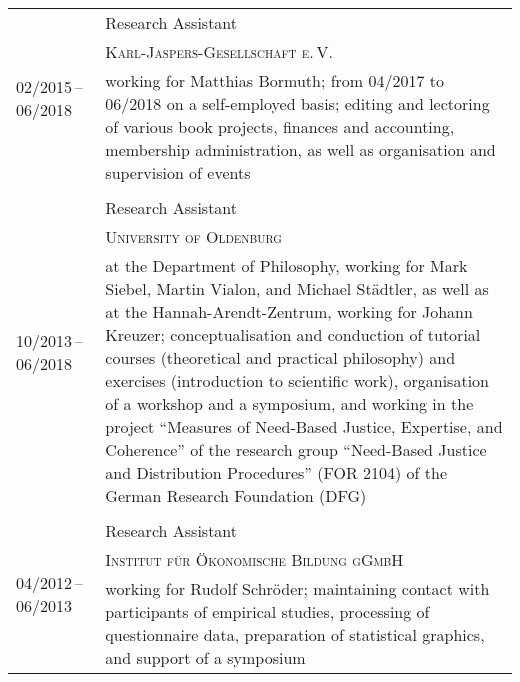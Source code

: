 \documentclass[a4paper,10pt]{article}
\begin{document}
\begin{longtable}{p{2.5cm}p{11cm}}
\\
\multirow{3}{2.5cm}{\footnotesize{02/2015\,--\,06/2018}} & Research Assistant\\
& \textsc{Karl-Jaspers-Gesellschaft e.\,V.}\\
& \footnotesize{working for Matthias Bormuth; from 04/2017 to 06/2018 on a self-employed basis; editing and lectoring of various book projects, finances and accounting, membership administration, as well as organisation and supervision of events}\\
\\
\multirow{3}{2.5cm}{\footnotesize{10/2013\,--\,06/2018}} & Research Assistant\\
& \textsc{University of Oldenburg}\\
& \footnotesize{at the Department of Philosophy, working for Mark Siebel, Martin Vialon, and Michael Städtler, as well as at the Hannah-Arendt-Zentrum, working for Johann Kreuzer; conceptualisation and conduction of tutorial courses (theoretical and practical philosophy) and exercises (introduction to scientific work), organisation of a workshop and a symposium, and working in the project \enquote{Measures of Need-Based Justice, Expertise, and Coherence} of the research group \enquote{Need-Based Justice and Distribution Procedures} (FOR 2104) of the German Research Foundation (DFG)}\\
\\
\multirow{3}{2.5cm}{\footnotesize{04/2012\,--\,06/2013}} & Research Assistant\\
& \textsc{Institut für Ökonomische Bildung gGmbH}\\
& \footnotesize{working for Rudolf Schröder; maintaining contact with participants of empirical studies, processing of questionnaire data, preparation of statistical graphics, and support of a symposium}\\
\end{longtable}


\clearpage
\end{document}
